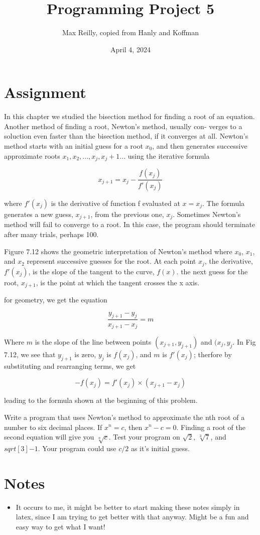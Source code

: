 \documentclass{article}
\title{Programming Project 5}
\author{Max Reilly, copied from Hanly and Koffman}
\date{April 4, 2024}
\begin{document}
\maketitle
\section{Assignment}
In this chapter we studied the bisection method for finding a root of an equation.
Another method of finding a root, Newton's method, usually con-
verges to a soluction even faster than the bisection method, if it converges at
all. Newton's method starts with an initial guess for a root $x_0$, and then
generates successive approximate roots $x_1, x_2, . . . , x_j, x_j+1 . . .$ using the
iterative formula

$$
x_{j+1} = x_j - \frac{f(x_j)}{f'(x_j)}
$$

where $f'(x_j)$ is the derivative of function f evaluated at $x = x_j$. The formula
generates a new guess, $x_{j+1}$, from the previous one, $x_{j}$. Sometimes Newton's
method will fail to converge to a root. In this case, the program should terminate
after many trials, perhaps 100.

Figure 7.12 shows the geometric interpretation of Newton's method where
$x_0$, $x_1$, and $x_2$ represent successive guesses for the root. At each point $x_j$, the
derivative, $f'(x_j)$, is the slope of the tangent to the curve, $f(x)$. the next guess
for the root, $x_{j+1}$, is the point at which the tangent crosses the x axis.

for geometry, we get the equation

$$
\frac{y_{j+1} - y_j}{x_{j+1} - x_j} = m
$$


Where $m$ is the slope of the line between points $(x_{j+1}, y_{j+1})$ and $(x_j, y_j$. In Fig
7.12, we see that $y_{j+1}$ is zero, $y_j$ is $f(x_j)$, and $m$ is $f'(x_j)$; therfore by substituting
and rearranging terms, we get

$$
-f(x_j) = f'(x_j) \times (x_{j+1} - x_j)
$$

leading to the formula shown at the beginning of this problem.

Write a program that uses Newton's method to approximate the nth root of
a number to six decimal places. If $x^n = c$, then $x^n -c = 0$. Finding a root of
the second equation will give you $\sqrt[n]{c}$. Test your program on $\sqrt{2}$, $\sqrt[3]{7}$, and
$sqrt[3]{-1}$. Your program could use $c/2$ as it's initial guess.

\section{Notes}
\begin{itemize}
    \item It occurs to me, it might be better to start making these notes simply in latex, since I am
            trying to get better with that anyway. Might be a fun and easy way to get what I want!
\end{itemize}
\end{document}
